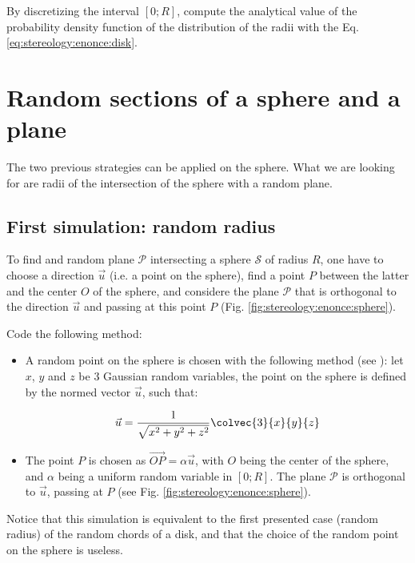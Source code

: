 \begin{qbox}By discretizing the interval $[0;R]$, compute the analytical value of the probability density function of the distribution of the radii with the Eq. \ref{eq:stereology:enonce:disk}.
\end{qbox}


\section{Random sections of a sphere and a plane}
The two previous strategies can be applied on the sphere. What we are looking for are radii of the intersection of the sphere with a random plane.


\subsection{First simulation: random radius}
To find and random plane $\mathcal{P}$ intersecting a sphere $\mathcal{S}$ of radius $R$, one have to choose a direction $\vec{u}$ (i.e. a point on the sphere), find a point $P$ between the latter and the center $O$ of the sphere, and considere the plane $\mathcal{P}$ that is orthogonal to the direction $\vec{u}$ and passing at this point $P$ (Fig. \ref{fig:stereology:enonce:sphere}). 

\begin{qbox}
Code the following method:

\begin{itemize}
 \item A random point on the sphere is chosen with the following method (see \cite{Marsaglia1972}): let $x$, $y$ and $z$ be 3 Gaussian random variables, the point on the sphere is defined by the normed vector $\vec{u}$, such that:
 
 \begin{equation}
  \vec{u}=\frac{1}{\sqrt{x^2+y^2+z^2}}\colvec{3}{x}{y}{z}\label{eq:stereology:enonce:pointsphere}
 \end{equation}

 \item The point $P$ is chosen as $\vec{OP}=\alpha\vec{u}$, with $O$ being the center of the sphere, and $\alpha$ being a uniform random variable in $[0;R]$. The plane $\mathcal{P}$ is orthogonal to $\vec{u}$, passing at $P$ (see Fig. \ref{fig:stereology:enonce:sphere}).
\end{itemize}
\end{qbox}
Notice that this simulation is equivalent to the first presented case (random radius) of the random chords of a disk, and that the choice of the random point on the sphere is useless.

